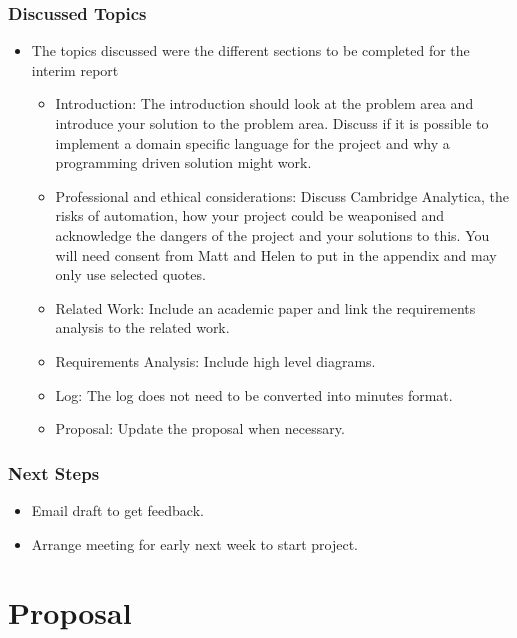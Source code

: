 \documentclass[chapterprefix=false]{scrreprt}
\begin{document}
\subsubsection{Discussed Topics}

\begin{itemize}
 \setlength\itemsep{-0.75em}
 \item The topics discussed were the different sections to be completed for the
 interim report
    \begin{itemize}
     \setlength\itemsep{-0.75em}
     \item Introduction: The introduction should look at the problem area and introduce your solution to the problem area. Discuss if it is possible to implement a domain specific language for the project and why a programming driven solution might work.
     \item Professional and ethical considerations: Discuss Cambridge Analytica, the risks of automation, how your project could be weaponised and acknowledge the dangers of the project and your solutions to this. You will need consent from Matt and Helen to put in the appendix and may only use selected quotes.
     \item Related Work: Include an academic paper and link the requirements analysis to the related work.
     \item Requirements Analysis: Include high level diagrams.
     \item Log: The log does not need to be converted into minutes format.
     \item Proposal: Update the proposal when necessary.
    \end{itemize}
\end{itemize}

\subsubsection{Next Steps}

\begin{itemize}
 \setlength\itemsep{-0.75em}
 \item Email draft to get feedback.
 \item Arrange meeting for early next week to start project.
\end{itemize}

\newpage

\section{Proposal}
\end{document}
